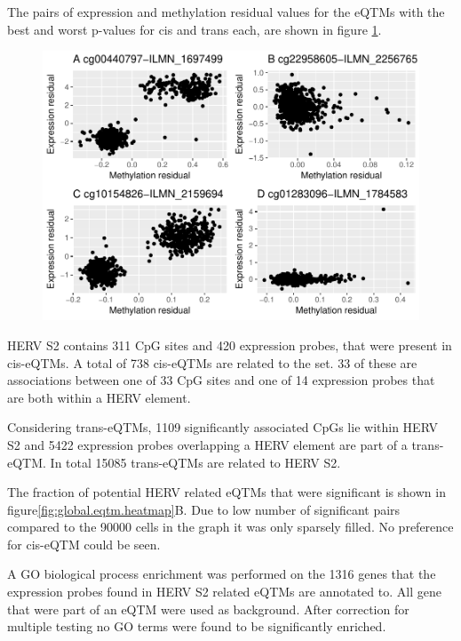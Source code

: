 \documentclass[a4paper,12pt,twoside,openright]{article}
\begin{document}
The pairs of expression and methylation residual values for the eQTMs with the best and worst p-values for cis and trans each, are shown in figure \ref{fig:best.worst.eqtm.scatter}. 
\begin{figure}[tb]
	\includegraphics[scale = 1, keepaspectratio = true]{../figures/best_worst_eqtm_scatter.pdf}  
	\caption{}
    \label{fig:best.worst.eqtm.scatter}
\end{figure}

HERV S2 contains 311 CpG sites and 420 expression probes, that were present in cis-eQTMs. A total of 738 cis-eQTMs are related to the set. 33 of these are associations between one of 33 CpG sites and one of 14 expression probes that are both  within a HERV element. 

Considering trans-eQTMs, 1109 significantly associated CpGs lie within HERV S2 and 5422 expression probes overlapping a HERV element are part of a trans-eQTM. In total 15085 trans-eQTMs are related to HERV S2.

The fraction of potential HERV related eQTMs that were significant is shown in figure\ref{fig:global.eqtm.heatmap}B. Due to low number of significant pairs compared to the 90000 cells in the graph it was only sparsely filled. No preference for cis-eQTM could be seen. 

A GO biological process enrichment was performed on the 1316 genes that the expression probes found in HERV S2 related eQTMs are annotated to. All gene that were part of an eQTM were used as background. After correction for multiple testing no GO terms were found to be significantly enriched. 
\end{document}
